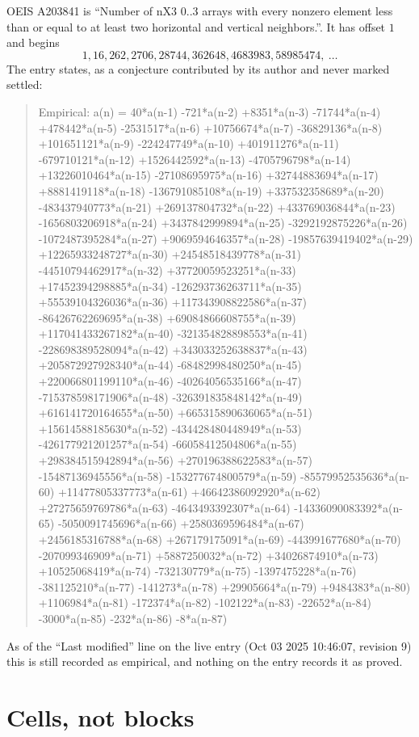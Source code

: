 \documentclass[11pt,a4paper]{article}
\theoremstyle{plain}
\theoremstyle{definition}
\begin{document}
OEIS A203841 is ``Number of nX3 0..3 arrays with every nonzero element less than or equal to at least two horizontal and vertical neighbors.''. It has offset $1$ and begins
\[
1, 16, 262, 2706, 28744, 362648, 4683983, 58985474,\ \dots
\]
The entry states, as a conjecture contributed by its author and never marked settled:
\begin{quote}
Empirical: a(n) = 40*a(n-1) -721*a(n-2) +8351*a(n-3) -71744*a(n-4) +478442*a(n-5) -2531517*a(n-6) +10756674*a(n-7) -36829136*a(n-8) +101651121*a(n-9) -224247749*a(n-10) +401911276*a(n-11) -679710121*a(n-12) +1526442592*a(n-13) -4705796798*a(n-14) +13226010464*a(n-15) -27108695975*a(n-16) +32744883694*a(n-17) +8881419118*a(n-18) -136791085108*a(n-19) +337532358689*a(n-20) -483437940773*a(n-21) +269137804732*a(n-22) +433769036844*a(n-23) -1656803206918*a(n-24) +3437842999894*a(n-25) -3292192875226*a(n-26) -1072487395284*a(n-27) +9069594646357*a(n-28) -19857639419402*a(n-29) +12265933248727*a(n-30) +24548518439778*a(n-31) -44510794462917*a(n-32) +37720059523251*a(n-33) +17452394298885*a(n-34) -126293736263711*a(n-35) +55539104326036*a(n-36) +117343908822586*a(n-37) -86426762269695*a(n-38) +69084866608755*a(n-39) +117041433267182*a(n-40) -321354828898553*a(n-41) -228698389528094*a(n-42) +343033252638837*a(n-43) +205872927928340*a(n-44) -68482998480250*a(n-45) +220066801199110*a(n-46) -40264056535166*a(n-47) -715378598171906*a(n-48) -326391835848142*a(n-49) +616141720164655*a(n-50) +665315890636065*a(n-51) +15614588185630*a(n-52) -434428480448949*a(n-53) -426177921201257*a(n-54) -66058412504806*a(n-55) +298384515942894*a(n-56) +270196388622583*a(n-57) -15487136945556*a(n-58) -153277674800579*a(n-59) -85579952535636*a(n-60) +11477805337773*a(n-61) +46642386092920*a(n-62) +27275659769786*a(n-63) -4643493392307*a(n-64) -14336090083392*a(n-65) -5050091745696*a(n-66) +2580369596484*a(n-67) +2456185316788*a(n-68) +267179175091*a(n-69) -443991677680*a(n-70) -207099346909*a(n-71) +5887250032*a(n-72) +34026874910*a(n-73) +10525068419*a(n-74) -732130779*a(n-75) -1397475228*a(n-76) -381125210*a(n-77) -141273*a(n-78) +29905664*a(n-79) +9484383*a(n-80) +1106984*a(n-81) -172374*a(n-82) -102122*a(n-83) -22652*a(n-84) -3000*a(n-85) -232*a(n-86) -8*a(n-87)
\end{quote}
As of the ``Last modified'' line on the live entry (Oct 03 2025 10:46:07, revision 9) this is still
recorded as empirical, and nothing on the entry records it as proved.

\section{Cells, not blocks}
\end{document}

